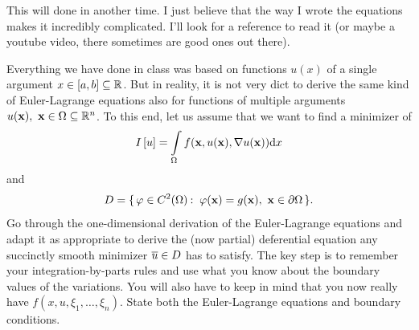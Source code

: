 \documentclass[12pt]{memoir}
\begin{document}
\begin{ptcb}
This will done in another time. I just believe that the way I wrote the equations makes it incredibly complicated. I'll look for a reference to read it (or maybe a youtube video, there sometimes are good ones out there).
\end{ptcb}
\begin{Ej}
    Everything we have done in class was based on functions $u(x)$ of a
single argument $x\in\left\lbrack a,b\right\rbrack\subseteq\mathbb{R}$. But in reality, it is not very dict to derive the same kind of Euler-Lagrange
equations also for functions of multiple arguments $u(\mathbf{x}),\ \mathbf{x}\in\Omega\subseteq\mathbb{R}^n$.
To this end, let us assume that we want to find a minimizer of
$$I\left\lbrack u\right\rbrack=\int\limits_\Omega f(\mathbf{x},u(\mathbf{x}),\nabla u(\mathbf{x}))\dd x$$
and
$$D=\{\,\varphi\in C^2(\Omega)\mathbin{:}\ \varphi(\mathbf{x})=g(\mathbf{x}),\ \mathbf{x}\in\partial\Omega\,\}.$$
Go through the one-dimensional derivation of the Euler-Lagrange equations and adapt it as appropriate to
derive the (now partial) deferential equation any succinctly smooth minimizer $\overline u\in D$ has to satisfy. The
key step is to remember your integration-by-parts rules and use what you know about the boundary values
of the variations. You will also have to keep in mind that you now really have $f(x, u,\xi_1,\dots,\xi_n)$.
State both the Euler-Lagrange equations and boundary conditions.
\end{Ej}
\end{document}
